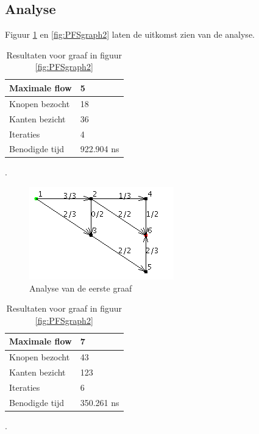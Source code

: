 \subsection{Analyse}

Figuur \ref{fig:PFSgraph1} en \ref{fig:PFSgraph2} laten de uitkomst zien van de analyse.

\begin{table}[h]
 \begin{tabularx}{\linewidth}{| l | X |}
 \hline
 Maximale flow & 5 \\
 \hline
 Knopen bezocht & 18 \\
 \hline
 Kanten bezicht & 36 \\
 \hline
 Iteraties & 4 \\
 \hline
 Benodigde tijd & 922.904 ns \\
 \hline
\end{tabularx}
\centering
\caption{Resultaten voor graaf in figuur \ref{fig:PFSgraph2}}.
\label{tbl:PFSgraph2}
\end{table}

\begin{figure}[h]
	\includegraphics[width=\linewidth]{priorityfirst/PFSgraph1}
	\centering
	\caption{Analyse van de eerste graaf}
	\label{fig:PFSgraph1}
\end{figure}

\begin{table}[h]
 \begin{tabularx}{\linewidth}{| l | X |}
 \hline
 Maximale flow & 7 \\
 \hline
 Knopen bezocht & 43 \\
 \hline
 Kanten bezicht & 123 \\
 \hline
 Iteraties & 6 \\
 \hline
 Benodigde tijd & 350.261 ns \\
 \hline
\end{tabularx}
\centering
\caption{Resultaten voor graaf in figuur \ref{fig:PFSgraph2}}.
\label{tbl:PFSgraph2}
\end{table}

